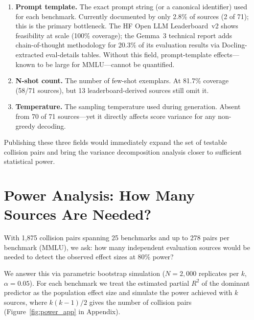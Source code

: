 \documentclass[11pt]{article}
\begin{document}
\begin{enumerate}[leftmargin=1.8em]
\item[\textbf{\small$\square$}] \textbf{Prompt template.}
  The exact prompt string (or a canonical identifier) used for each
  benchmark. Currently documented by only 2.8\% of sources (2 of 71);
  this is the primary bottleneck. The HF Open LLM Leaderboard~v2 shows
  feasibility at scale (100\% coverage); the Gemma~3 technical report adds
  chain-of-thought methodology for 20.3\% of its evaluation results via
  Docling-extracted eval-details tables.
  Without this field, prompt-template effects---known to be large for
  MMLU---cannot be quantified.
\item[\textbf{\small$\square$}] \textbf{N-shot count.}
  The number of few-shot exemplars. At 81.7\% coverage (58/71 sources),
  but 13 leaderboard-derived sources still omit it.
\item[\textbf{\small$\square$}] \textbf{Temperature.}
  The sampling temperature used during generation. Absent from 70
  of 71 sources---yet it directly affects score variance for any
  non-greedy decoding.
\end{enumerate}

\noindent
Publishing these three fields would immediately expand the set of
testable collision pairs and bring the variance decomposition
analysis closer to sufficient statistical power.

\section{Power Analysis: How Many Sources Are Needed?}
\label{sec:power}

With 1,875 collision pairs spanning 25 benchmarks and up to 278 pairs per
benchmark (MMLU), we ask: how many independent evaluation sources would
be needed to detect the observed effect sizes at 80\% power?

We answer this via parametric bootstrap simulation ($N=2{,}000$ replicates
per $k$, $\alpha=0.05$). For each benchmark we treat the estimated partial
$R^2$ of the dominant predictor as the population effect size
and simulate the power achieved with $k$ sources, where $k(k-1)/2$ gives
the number of collision pairs (Figure~\ref{fig:power_app} in Appendix).
\end{document}

